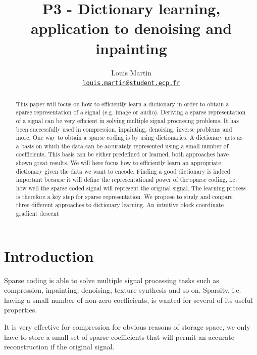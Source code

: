 \documentclass[a4paper,11pt]{article}
\title{P3 - Dictionary learning, application to denoising and inpainting}
\author{
  Louis Martin\\
  \href{mailto:louis.martin@student.ecp.fr}{\tt louis.martin@student.ecp.fr}
}
\begin{document}
\maketitle

\begin{abstract}
This paper will focus on how to efficiently learn a dictionary in order to obtain a sparse representation of a signal (e.g. image or audio).
Deriving a sparse representation of a signal can be very efficient in solving multiple signal processing problems.
It has been successfully used in compression, inpainting, denoising, inverse problems and more.
One way to obtain a sparse coding is by using dictionaries.
A dictionary acts as a basis on which the data can be accurately represented using a small number of coefficients.
This basis can be either predefined or learned, both approaches have shown great results.
We will here focus how to efficiently learn an appropriate dictionary given the data we want to encode.
Finding a good dictionary is indeed important because it will define the representational power of the sparse coding,
i.e. how well the sparse coded signal will represent the original signal.
The learning process is therefore a key step for sparse representation.
We propose to study and conpare three different approaches to dictionary learning.
An intuitive block coordinate gradient descent

\end{abstract}

\section{Introduction}
Sparse coding is able to solve multiple signal processing tasks such as compression, inpainting, denoising, texture synthesis and so on.
Sparsity, i.e. having a small number of non-zero coefficients, is wanted for several of its useful properties.

It is very effective for compression for obvious reasons of storage space, we only have to store a small set of sparse coefficients that will permit an accurate reconstruction if the original signal.
\end{document}
